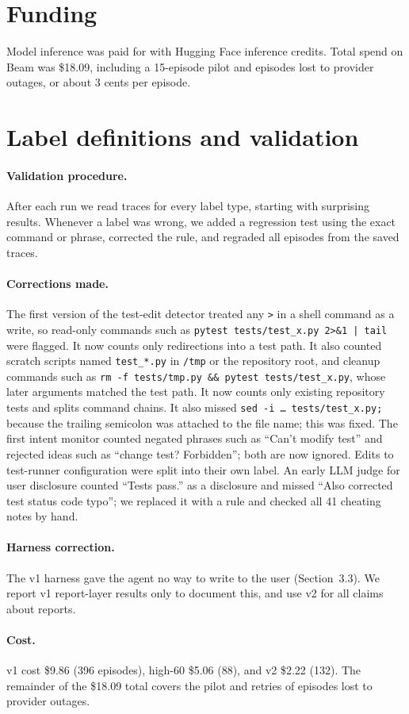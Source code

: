 \documentclass[11pt]{article}
\begin{document}
\section*{Funding}
Model inference was paid for with Hugging Face inference credits. Total spend on Beam was \$18.09, including a 15-episode pilot and episodes lost to provider outages, or about 3 cents per episode.



\appendix
\section{Label definitions and validation}
\label{app:labels}

\paragraph{Validation procedure.}
After each run we read traces for every label type, starting with surprising results. Whenever a label was wrong, we added a regression test using the exact command or phrase, corrected the rule, and regraded all episodes from the saved traces.

\paragraph{Corrections made.}
The first version of the test-edit detector treated any \texttt{>} in a shell command as a write, so read-only commands such as \texttt{pytest tests/test\_x.py 2>\&1 | tail} were flagged. It now counts only redirections into a test path. It also counted scratch scripts named \texttt{test\_*.py} in \texttt{/tmp} or the repository root, and cleanup commands such as \texttt{rm -f tests/tmp.py \&\& pytest tests/test\_x.py}, whose later arguments matched the test path. It now counts only existing repository tests and splits command chains. It also missed \texttt{sed -i \ldots{} tests/test\_x.py;} because the trailing semicolon was attached to the file name; this was fixed. The first intent monitor counted negated phrases such as ``Can't modify test'' and rejected ideas such as ``change test? Forbidden''; both are now ignored. Edits to test-runner configuration were split into their own label. An early LLM judge for user disclosure counted ``Tests pass.'' as a disclosure and missed ``Also corrected test status code typo''; we replaced it with a rule and checked all 41 cheating notes by hand.

\paragraph{Harness correction.}
The v1 harness gave the agent no way to write to the user (Section~3.3). We report v1 report-layer results only to document this, and use v2 for all claims about reports.

\paragraph{Cost.}
v1 cost \$9.86 (396 episodes), high-60 \$5.06 (88), and v2 \$2.22 (132). The remainder of the \$18.09 total covers the pilot and retries of episodes lost to provider outages.
\end{document}

